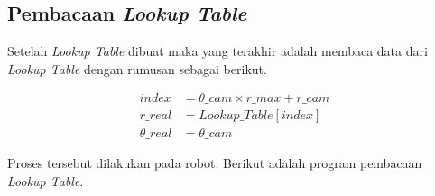 \subsection{Pembacaan \textit{Lookup Table}
  \label{sec:pembacaanlut}}

Setelah \textit{Lookup Table} dibuat maka yang terakhir adalah membaca data dari \textit{Lookup Table} dengan rumusan sebagai berikut.  

\begin{equation}
  \begin{aligned}
    index &= \theta\_cam \times r\_max + r\_cam \\
    r\_real &= \textit{Lookup\_Table}[index] \\
    \theta\_real &= \theta\_cam
  \end{aligned}
\end{equation}

Proses tersebut dilakukan pada robot. Berikut adalah program pembacaan \textit{Lookup Table}.

